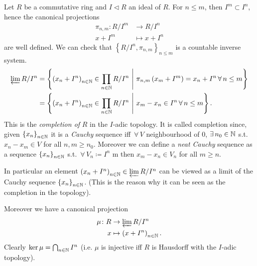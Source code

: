 \begin{ex}
	Let $R$ be a commutative ring and $I \triangleleft R$ an ideal of $R$.
	For $n \leq m$, then $I^m \subset I^n$, hence the canonical projections
	\begin{align}
		\pi_{n,m}\colon R/I^m &\to R/I^n \\
		x + I^m &\mapsto x + I^n
	\end{align} 
	are well defined.
	We can check that $\left\{ R/I^n, \pi_{n,m} \right\}_{n \leq m}$ is a countable inverse system.
	\begin{align}
		\varprojlim R/I^n &=
		\left\{ \left( x_n + I^n \right)_{n \in \N} \in \prod_{n \in \N} R/I^n \ \middle|\ 
		\pi_{n,m}\left( x_m + I^m \right) = x_n + I^n \,\forall\, n \leq m \right\}\\
				  &=
		\left\{ \left( x_n + I^n \right)_{n \in \N} \in \prod_{n \in \N} R/I^n \ \middle|\ 
		x_m - x_n \in I^n \,\forall\, n \leq m \right\}
	.\end{align} 
	This is the {\em completion of} $R$ in the $I$-adic topology.
	It is called completion since, given $\left\{ x_n \right\}_{n \in \mathbb{N}}$ it is a {\em Cauchy} sequence iff
	$\,\forall\, V$ neighbourhood of $0$, $\exists\, n_0 \in \mathbb{N}$ s.t. $x_n - x_m \in V$ for all $n,m \geq n_0$.
	Moreover we can define a {\em neat Cauchy} sequence as a sequence $\left\{ x_n \right\}_{n \in \mathbb{N}}$ s.t.
	$\,\forall\, V_n \coloneqq I^n$ m then $x_m - x_n \in V_n$ for all $m \geq n$.

	In particular an element $\left( x_n + I^n \right)_{n \in \mathbb{N}} \in \varprojlim R/I^n$ can be viewed as a limit
	of the Cauchy sequence $\left\{ x_n \right\}_{n \in \mathbb{N}}$.
	(This is the reason why it can be seen as the completion in the topology).

	Moreover we have a canonical projection
	\begin{align}
		\mu\colon R &\to \varprojlim R/I^n \\
		x &\mapsto \left( x + I^n \right)_{n \in \mathbb{N}}
	.\end{align} 
	Clearly $\ker \mu = \bigcap_{n \in \mathbb{N}} I^n$ (i.e. $\mu$ is injective iff
	$R$ is Hausdorff with the $I$-adic topology).
\end{ex} 

